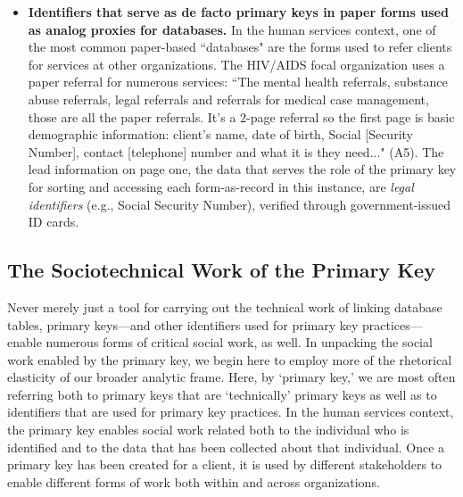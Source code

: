 \begin{itemize}
\item \textbf{Identifiers that serve as de facto primary keys in paper forms used as analog proxies for databases.} In the human services context, one of the most common paper-based ``databases" are the forms used to refer clients for services at other organizations. The HIV/AIDS focal organization uses a paper referral for numerous services: ``The mental health referrals, substance abuse referrals, legal referrals and referrals for medical case management, those are all the paper referrals. It's a 2-page referral so the first page is basic demographic information: client's name, date of birth, Social [Security Number], contact [telephone] number and what it is they need..." (A5). The lead information on page one, the data that serves the role of the primary key for sorting and accessing each form-as-record in this instance, are \textit{legal identifiers} (e.g., Social Security Number), verified through government-issued ID cards.
\end{itemize}

\subsection{The Sociotechnical Work of the Primary Key}
Never merely just a tool for carrying out the technical work of linking database tables, primary keys---and other identifiers used for primary key practices---enable numerous forms of critical social work, as well. In unpacking the social work enabled by the primary key, we begin here to employ more of the rhetorical elasticity of our broader analytic frame. Here, by `primary key,' we are most often referring both to primary keys that are `technically' primary keys as well as to identifiers that are used for primary key practices. In the human services context, the primary key enables social work related both to the individual who is identified and to the data that has been collected about that individual. Once a primary key has been created for a client, it is used by different stakeholders to enable different forms of work both within and across organizations.  

